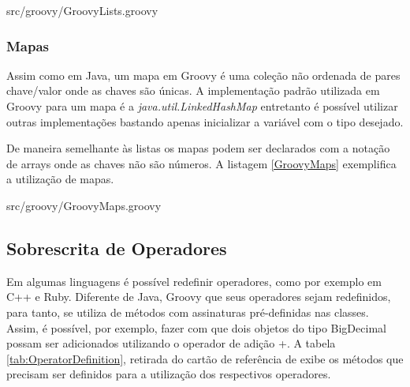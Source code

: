 \documentclass[12pt]{article}
\begin{document}
    
                    {src/groovy/GroovyLists.groovy}

\subsubsection{Mapas}

    Assim como em Java, um mapa em Groovy é uma coleção não ordenada de pares 
    chave/valor onde as chaves são únicas. A implementação padrão utilizada em 
    Groovy para um mapa é a \emph{java.util.LinkedHashMap} entretanto é possível
    utilizar outras implementações bastando apenas inicializar a variável com o 
    tipo desejado.
    
    De maneira semelhante às listas os mapas podem ser declarados com a notação
    de arrays onde as chaves não são números. A listagem \ref{GroovyMaps} exemplifica
    a utilização de mapas.
    
    
                    {src/groovy/GroovyMaps.groovy}
    
\subsection{Sobrescrita de Operadores}  
    
    Em algumas linguagens é possível redefinir operadores, como por exemplo em 
    C++ e Ruby. Diferente de Java, Groovy que seus operadores sejam redefinidos,
    para tanto, se utiliza de métodos com assinaturas pré-definidas nas classes.
    Assim, é possível, por exemplo, fazer com que dois objetos do tipo BigDecimal
    possam ser adicionados utilizando o operador de adição +. A tabela 
    \ref{tab:OperatorDefinition}, retirada do cartão de referência de \cite{groovy:refcard} 
    exibe os métodos que precisam ser definidos para a utilização dos respectivos 
    operadores.
\end{document}
